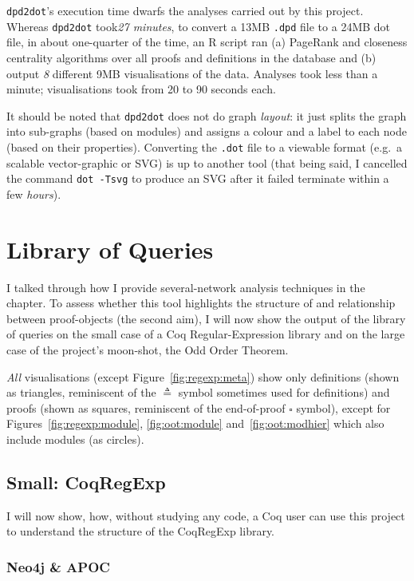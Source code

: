 \texttt{dpd2dot}'s  execution time dwarfs the analyses carried out by this
project. Whereas \texttt{dpd2dot} took\emph{27 minutes}, to convert a 13MB
\texttt{.dpd} file to a 24MB dot file, in about one-quarter of the time, an R
script ran (a) PageRank and closeness centrality algorithms over all proofs and
definitions in the database and (b) output \emph{8} different 9MB visualisations
of the data.  Analyses took less than a minute; visualisations took from 20 to
90 seconds each.

It should be noted that \texttt{dpd2dot} does not do graph \emph{layout}: it
just splits the graph into sub-graphs (based on modules) and assigns a colour
and a label to each node (based on their properties). Converting the
\texttt{.dot} file to a viewable format (e.g.\ a scalable vector-graphic or SVG)
is up to another tool (that being said, I cancelled the command \texttt{dot
-Tsvg} to produce an SVG after it failed terminate within a few \emph{hours}).

\section{Library of Queries}\label{sec:libeval}

I talked through how I provide several-network analysis techniques in
the~ chapter. To assess whether this tool highlights the
structure of and relationship between proof-objects (the second aim), I will now
show the output of the library of queries on the small case of a Coq
Regular-Expression library and on the large case of the project's moon-shot, the
Odd Order Theorem.

\emph{All} visualisations (except Figure~\ref{fig:regexp:meta}) show only
definitions (shown as triangles, reminiscent of the $\triangleq$ symbol
sometimes used for definitions) and proofs (shown as squares, reminiscent of the
end-of-proof $\square$ symbol), except for Figures~\ref{fig:regexp:module},
\ref{fig:oot:module} and~\ref{fig:oot:modhier} which also include modules (as
circles).

\subsection{Small: CoqRegExp}

I will now show, how, without studying any code, a Coq user can use this
project to understand the structure of the CoqRegExp library.

\subsubsection{Neo4j \& APOC}

